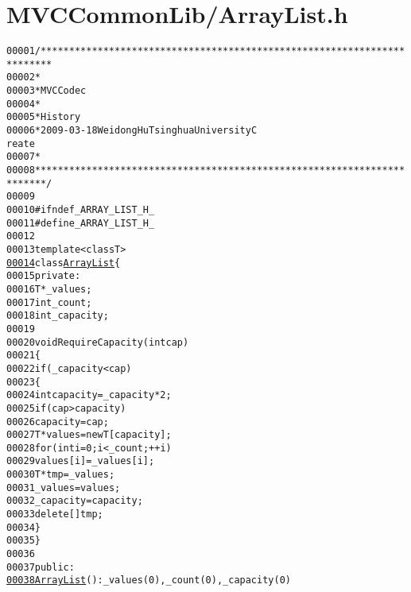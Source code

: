 \hypertarget{_array_list_8h_source}{
\section{MVCCommonLib/ArrayList.h}
}


\begin{footnotesize}\begin{alltt}
00001 \textcolor{comment}{/************************************************************************}
00002 \textcolor{comment}{ *}
00003 \textcolor{comment}{ * MVC Codec}
00004 \textcolor{comment}{ * }
00005 \textcolor{comment}{ * History}
00006 \textcolor{comment}{ * 2009-03-18           Weidong Hu              Tsinghua University             C
      reate}
00007 \textcolor{comment}{ * }
00008 \textcolor{comment}{ ************************************************************************/}
00009 
00010 \textcolor{preprocessor}{#ifndef \_ARRAY\_LIST\_H\_}
00011 \textcolor{preprocessor}{}\textcolor{preprocessor}{#define \_ARRAY\_LIST\_H\_}
00012 \textcolor{preprocessor}{}
00013 \textcolor{keyword}{template} <\textcolor{keyword}{class} T>
\hypertarget{_array_list_8h_source_l00014}{}\hyperlink{class_array_list}{00014} \textcolor{keyword}{class }\hyperlink{class_array_list}{ArrayList} \{
00015 \textcolor{keyword}{private}:
00016         T *\_values;
00017         \textcolor{keywordtype}{int} \_count;
00018         \textcolor{keywordtype}{int} \_capacity;
00019         
00020         \textcolor{keywordtype}{void} RequireCapacity(\textcolor{keywordtype}{int} cap)
00021         \{
00022                 \textcolor{keywordflow}{if} (\_capacity < cap)
00023                 \{
00024                         \textcolor{keywordtype}{int} capacity = \_capacity * 2;
00025                         \textcolor{keywordflow}{if} (cap > capacity)
00026                                 capacity = cap;
00027                         T* values = \textcolor{keyword}{new} T[capacity];
00028                         \textcolor{keywordflow}{for} (\textcolor{keywordtype}{int} i = 0; i < \_count; ++i)
00029                                 values[i] = \_values[i];
00030                         T* tmp = \_values;
00031                         \_values = values;
00032                         \_capacity = capacity;
00033                         \textcolor{keyword}{delete}[] tmp;
00034                 \}
00035         \}
00036 
00037 \textcolor{keyword}{public}:
\hypertarget{_array_list_8h_source_l00038}{}\hyperlink{class_array_list_a77ba51ae82bb2246563af5c4d64d438e}{00038}         \hyperlink{class_array_list_a77ba51ae82bb2246563af5c4d64d438e}{ArrayList}() : \_values(0), \_count(0), \_capacity(0)

\end{alltt}
\end{footnotesize}
